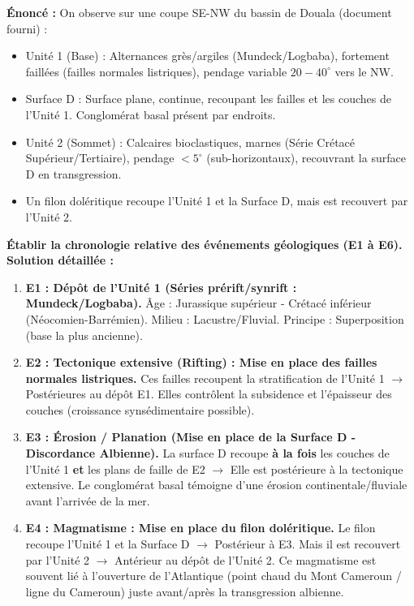 \documentclass[11pt]{article}
\begin{document}
\begin{exoresolu}
\textbf{Énoncé :} On observe sur une coupe SE-NW du bassin de Douala (document fourni) :
\begin{itemize}
    \item Unité 1 (Base) : Alternances grès/argiles (Mundeck/Logbaba), fortement faillées (failles normales listriques), pendage variable $20-40^\circ$ vers le NW.
    \item Surface D : Surface plane, continue, recoupant les failles et les couches de l'Unité 1. Conglomérat basal présent par endroits.
    \item Unité 2 (Sommet) : Calcaires bioclastiques, marnes (Série Crétacé Supérieur/Tertiaire), pendage $< 5^\circ$ (sub-horizontaux), recouvrant la surface D en transgression.
    \item Un filon doléritique recoupe l'Unité 1 et la Surface D, mais est recouvert par l'Unité 2.
\end{itemize}
\textbf{Établir la chronologie relative des événements géologiques (E1 à E6).}
\tcblower
\textbf{Solution détaillée :}
\begin{enumerate}
    \item \textbf{E1 : Dépôt de l'Unité 1 (Séries prérift/synrift : Mundeck/Logbaba).} Âge : Jurassique supérieur - Crétacé inférieur (Néocomien-Barrémien). Milieu : Lacustre/Fluvial. Principe : Superposition (base la plus ancienne).
    \item \textbf{E2 : Tectonique extensive (Rifting) : Mise en place des failles normales listriques.} Ces failles recoupent la stratification de l'Unité 1 $\rightarrow$ Postérieures au dépôt E1. Elles contrôlent la subsidence et l'épaisseur des couches (croissance synsédimentaire possible).
    \item \textbf{E3 : Érosion / Planation (Mise en place de la Surface D - Discordance Albienne).} La surface D recoupe \textbf{à la fois} les couches de l'Unité 1 \textbf{et} les plans de faille de E2 $\rightarrow$ Elle est postérieure à la tectonique extensive. Le conglomérat basal témoigne d'une érosion continentale/fluviale avant l'arrivée de la mer.
    \item \textbf{E4 : Magmatisme : Mise en place du filon doléritique.} Le filon recoupe l'Unité 1 et la Surface D $\rightarrow$ Postérieur à E3. Mais il est recouvert par l'Unité 2 $\rightarrow$ Antérieur au dépôt de l'Unité 2. Ce magmatisme est souvent lié à l'ouverture de l'Atlantique (point chaud du Mont Cameroun / ligne du Cameroun) juste avant/après la transgression albienne.

\end{enumerate}
\end{exoresolu}
\end{document}
